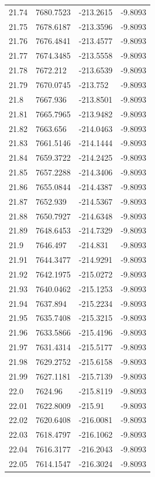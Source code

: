 \begin{table}[H]
\begin{tabular}{llll}
21.74 & 7680.7523 & -213.2615 & -9.8093 \\
21.75 & 7678.6187 & -213.3596 & -9.8093 \\
21.76 & 7676.4841 & -213.4577 & -9.8093 \\
21.77 & 7674.3485 & -213.5558 & -9.8093 \\
21.78 & 7672.212 & -213.6539 & -9.8093 \\
21.79 & 7670.0745 & -213.752 & -9.8093 \\
21.8 & 7667.936 & -213.8501 & -9.8093 \\
21.81 & 7665.7965 & -213.9482 & -9.8093 \\
21.82 & 7663.656 & -214.0463 & -9.8093 \\
21.83 & 7661.5146 & -214.1444 & -9.8093 \\
21.84 & 7659.3722 & -214.2425 & -9.8093 \\
21.85 & 7657.2288 & -214.3406 & -9.8093 \\
21.86 & 7655.0844 & -214.4387 & -9.8093 \\
21.87 & 7652.939 & -214.5367 & -9.8093 \\
21.88 & 7650.7927 & -214.6348 & -9.8093 \\
21.89 & 7648.6453 & -214.7329 & -9.8093 \\
21.9 & 7646.497 & -214.831 & -9.8093 \\
21.91 & 7644.3477 & -214.9291 & -9.8093 \\
21.92 & 7642.1975 & -215.0272 & -9.8093 \\
21.93 & 7640.0462 & -215.1253 & -9.8093 \\
21.94 & 7637.894 & -215.2234 & -9.8093 \\
21.95 & 7635.7408 & -215.3215 & -9.8093 \\
21.96 & 7633.5866 & -215.4196 & -9.8093 \\
21.97 & 7631.4314 & -215.5177 & -9.8093 \\
21.98 & 7629.2752 & -215.6158 & -9.8093 \\
21.99 & 7627.1181 & -215.7139 & -9.8093 \\
22.0 & 7624.96 & -215.8119 & -9.8093 \\
22.01 & 7622.8009 & -215.91 & -9.8093 \\
22.02 & 7620.6408 & -216.0081 & -9.8093 \\
22.03 & 7618.4797 & -216.1062 & -9.8093 \\
22.04 & 7616.3177 & -216.2043 & -9.8093 \\
22.05 & 7614.1547 & -216.3024 & -9.8093 \\

\end{tabular}
\end{table}
